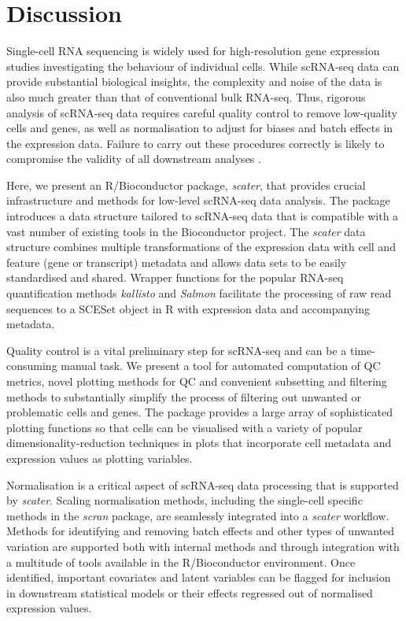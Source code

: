 \documentclass{bioinfo}
\begin{document}
\section{Discussion}\label{discussion}

Single-cell RNA sequencing is widely used for high-resolution gene
expression studies investigating the behaviour of individual cells.
While scRNA-seq data can provide substantial biological insights, the
complexity and noise of the data is also much greater than that of
conventional bulk RNA-seq. Thus, rigorous analysis of scRNA-seq data
requires careful quality control to remove low-quality cells and genes,
as well as normalisation to adjust for biases and batch effects in the
expression data. Failure to carry out these procedures correctly is
likely to compromise the validity of all downstream analyses
\citep{Leek2010-nq,Hicks2015-qy,Tung2016-jy,Bacher2016-ay,Grun2015-xi}.

Here, we present an R/Bioconductor package, \emph{scater}, that provides
crucial infrastructure and methods for low-level scRNA-seq data
analysis. The package introduces a data structure tailored to scRNA-seq
data that is compatible with a vast number of existing tools in the
Bioconductor project. The \emph{scater} data structure combines multiple
transformations of the expression data with cell and feature (gene or
transcript) metadata and allows data sets to be easily standardised and
shared. Wrapper functions for the popular RNA-seq quantification methods
\emph{kallisto} and \emph{Salmon} facilitate the processing of raw read
sequences to a SCESet object in R with expression data and accompanying
metadata.

Quality control is a vital preliminary step for scRNA-seq and can be a
time-consuming manual task. We present a tool for automated computation
of QC metrics, novel plotting methods for QC and convenient subsetting
and filtering methods to substantially simplify the process of filtering
out unwanted or problematic cells and genes. The package provides a
large array of sophisticated plotting functions so that cells can be
visualised with a variety of popular dimensionality-reduction techniques
in plots that incorporate cell metadata and expression values as
plotting variables.

Normalisation is a critical aspect of scRNA-seq data processing that is supported by \emph{scater}. Scaling normalisation methods, including the single-cell specific methods in the \emph{scran} package, are seamlessly integrated into a \emph{scater} workflow. Methods for identifying and removing batch effects and other types of unwanted variation are supported both with internal methods and through integration with a multitude of tools available in the R/Bioconductor environment. Once identified, important covariates and latent variables can be flagged for inclusion in downstream statistical models or their effects regressed out of normalised expression values.
\end{document}
